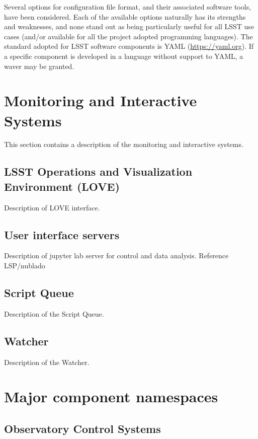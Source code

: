 Several options for configuration file format, and their associated software tools, have been considered. Each of the 
available options naturally has its strengths and weaknesses, and none stand out as being particularly useful for all LSST 
use cases (and/or available for all the project adopted programming languages). The standard adopted for LSST 
software components is YAML (\url{https://yaml.org}). If a specific component is developed in a language without support
to YAML, a waver may be granted.

\section{Monitoring and Interactive Systems}\label{sect:mis}

This section contains a description of the monitoring and interactive systems.

\subsection{LSST Operations and Visualization Environment (LOVE)}\label{sect:love}

Description of LOVE interface.

\subsection{User interface servers}\label{sect:uis}

Description of jupyter lab server for control and data analysis. Reference LSP/nublado

\subsection{Script Queue}\label{sect:scriptqueue}

Description of the Script Queue. 

\subsection{Watcher}\label{sect:watcher}

Description of the Watcher. 

\section{Major component namespaces}\label{sect:major}

\subsection{Observatory Control Systems}\label{sect:ocs}

